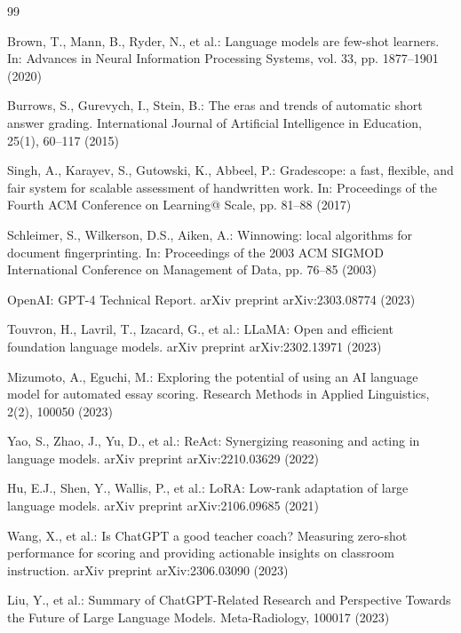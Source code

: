 \documentclass[runningheads]{llncs}
\begin{document}
\begin{thebibliography}{99}

Brown, T., Mann, B., Ryder, N., et al.: Language models are few-shot learners. In: Advances in Neural Information Processing Systems, vol. 33, pp. 1877--1901 (2020)

Burrows, S., Gurevych, I., Stein, B.: The eras and trends of automatic short answer grading. International Journal of Artificial Intelligence in Education, 25(1), 60--117 (2015)

Singh, A., Karayev, S., Gutowski, K., Abbeel, P.: Gradescope: a fast, flexible, and fair system for scalable assessment of handwritten work. In: Proceedings of the Fourth ACM Conference on Learning@ Scale, pp. 81--88 (2017)

Schleimer, S., Wilkerson, D.S., Aiken, A.: Winnowing: local algorithms for document fingerprinting. In: Proceedings of the 2003 ACM SIGMOD International Conference on Management of Data, pp. 76--85 (2003)

OpenAI: GPT-4 Technical Report. arXiv preprint arXiv:2303.08774 (2023)

Touvron, H., Lavril, T., Izacard, G., et al.: LLaMA: Open and efficient foundation language models. arXiv preprint arXiv:2302.13971 (2023)

Mizumoto, A., Eguchi, M.: Exploring the potential of using an AI language model for automated essay scoring. Research Methods in Applied Linguistics, 2(2), 100050 (2023)

Yao, S., Zhao, J., Yu, D., et al.: ReAct: Synergizing reasoning and acting in language models. arXiv preprint arXiv:2210.03629 (2022)

Hu, E.J., Shen, Y., Wallis, P., et al.: LoRA: Low-rank adaptation of large language models. arXiv preprint arXiv:2106.09685 (2021)

Wang, X., et al.: Is ChatGPT a good teacher coach? Measuring zero-shot performance for scoring and providing actionable insights on classroom instruction. arXiv preprint arXiv:2306.03090 (2023)

Liu, Y., et al.: Summary of ChatGPT-Related Research and Perspective Towards the Future of Large Language Models. Meta-Radiology, 100017 (2023)


\end{thebibliography}
\end{document}
